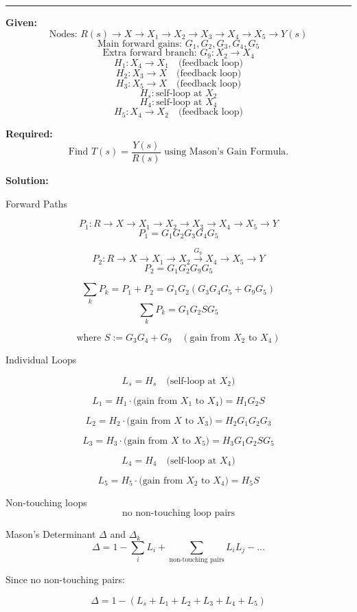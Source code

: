 \noindent\rule{\textwidth}{1pt}

\textbf{Given:}
\[
\text{Nodes: } R(s)\longrightarrow X \longrightarrow X_1 \longrightarrow X_2 \longrightarrow X_3 \longrightarrow X_4 \longrightarrow X_5 \longrightarrow Y(s)
\]
\[
\text{Main forward gains: } G_1, G_2, G_3, G_4, G_5
\]
\[
\text{Extra forward branch: } G_9: X_2 \to X_4
\]
\[
H_1: X_4 \to X_1 \quad \text{(feedback loop)}
\]
\[
H_2: X_3 \to X \quad \text{(feedback loop)}
\]
\[
H_3: X_5 \to X \quad \text{(feedback loop)}
\]
\[
H_s: \text{self-loop at } X_2
\]
\[
H_4: \text{self-loop at } X_4
\]
\[
H_5: X_4 \to X_2 \quad \text{(feedback loop)}
\]


\textbf{Required:}
\[
\text{Find } T(s)=\frac{Y(s)}{R(s)} \text{ using Mason's Gain Formula.}
\]

\textbf{Solution:}

Forward Paths

\[
P_1: R\to X\to X_1\to X_2\to X_3\to X_4\to X_5\to Y
\]
\[
P_1 = G_1 G_2 G_3 G_4 G_5
\]

\[
P_2: R\to X\to X_1\to X_2 \xrightarrow{G_9} X_4 \to X_5 \to Y
\]
\[
P_2 = G_1 G_2 G_9 G_5
\]

\[
\sum_k P_k = P_1 + P_2 = G_1 G_2 (G_3 G_4 G_5 + G_9 G_5) 
\]
\[
\sum_k P_k = G_1 G_2 S G_5
\]

\[
\text{where } S := G_3 G_4 + G_9 \quad (\text{gain from } X_2 \text{ to } X_4)
\]

Individual Loops

\[
L_s = H_s \quad \text{(self-loop at } X_2)
\]

\[
L_1 = H_1 \cdot \text{(gain from } X_1 \text{ to } X_4) = H_1 G_2 S
\]

\[
L_2 = H_2 \cdot \text{(gain from } X \text{ to } X_3) = H_2 G_1 G_2 G_3
\]

\[
L_3 = H_3 \cdot \text{(gain from } X \text{ to } X_5) = H_3 G_1 G_2 S G_5
\]

\[
L_4 = H_4 \quad \text{(self-loop at } X_4)
\]

\[
L_5 = H_5 \cdot \text{(gain from } X_2 \text{ to } X_4) = H_5 S
\]

Non-touching loops
\[\text{no non-touching loop pairs}\]

Mason's Determinant \(\Delta\) and \(\Delta_k\)
\[
\Delta = 1 - \sum_i L_i + \sum_{\text{non-touching pairs}} L_i L_j - \dots
\]

Since no non-touching pairs:

\[
\Delta = 1 - (L_s + L_1 + L_2 + L_3 + L_4 + L_5)
\]

